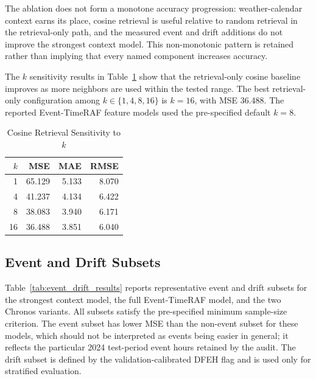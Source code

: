 The ablation does not form a monotone accuracy progression: weather-calendar
context earns its place, cosine retrieval is useful relative to random retrieval
in the retrieval-only path, and the measured event and drift additions do not
improve the strongest context model. This non-monotonic pattern is retained
rather than implying that every named component increases accuracy.

The $k$ sensitivity results in Table~\ref{tab:k_sensitivity} show that the
retrieval-only cosine baseline improves as more neighbors are used within the
tested range. The best retrieval-only configuration among $k \in \{1,4,8,16\}$
is $k=16$, with MSE 36.488. The reported Event-TimeRAF feature models used the
pre-specified default $k=8$.

\begin{table}[!t]
\centering
\caption{Cosine Retrieval Sensitivity to $k$}
\label{tab:k_sensitivity}
\begin{tabular}{rrrr}
\toprule
$k$ & MSE & MAE & RMSE \\
\midrule
1 & 65.129 & 5.133 & 8.070 \\
4 & 41.237 & 4.134 & 6.422 \\
8 & 38.083 & 3.940 & 6.171 \\
16 & 36.488 & 3.851 & 6.040 \\
\bottomrule
\end{tabular}
\end{table}

\subsection{Event and Drift Subsets}
Table~\ref{tab:event_drift_results} reports representative event and drift
subsets for the strongest context model, the full Event-TimeRAF model, and the
two Chronos variants. All subsets
satisfy the pre-specified minimum sample-size criterion. The event subset has lower MSE than the non-event
subset for these models, which should not be interpreted as events being easier
in general; it reflects the particular 2024 test-period event hours retained by
the audit. The drift subset is defined by the validation-calibrated DFEH flag
and is used only for stratified evaluation.

